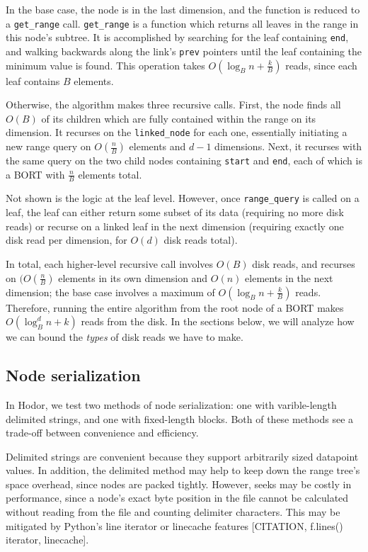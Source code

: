 \documentclass[11pt, oneside]{article}
\newcommand{\ms}{\texttt}
\begin{document}
In the base case, the node is in the last dimension, and the function is reduced
to a \ms{get\_range} call. \ms{get\_range} is a function which returns all
leaves in the range in this node's subtree. It is accomplished by searching for
the leaf containing \ms{end}, and walking backwards along the link's \ms{prev}
pointers until the leaf containing the minimum value is found. This operation
takes $O(\log_B n + \frac{k}{B})$ reads, since each leaf contains $B$ elements.

Otherwise, the algorithm makes three recursive calls. First, the node finds all
$O(B)$ of its children which are fully contained within the range on its
dimension. It recurses on the \ms{linked\_node} for each one, essentially
initiating a new range query on $O(\frac{n}{B})$ elements and $d - 1$
dimensions. Next, it recurses with the same query on the two child nodes
containing \ms{start} and \ms{end}, each of which is a BORT with $\frac{n}{B}$
elements total.

Not shown is the logic at the leaf level. However, once \ms{range\_query} is
called on a leaf, the leaf can either return some subset of its data (requiring
no more disk reads) or recurse on a linked leaf in the next dimension (requiring
exactly one disk read per dimension, for $O(d)$ disk reads total).

In total, each higher-level recursive call involves $O(B)$ disk reads, and
recurses on $(O(\frac{n}{B})$ elements in its own dimension and $O(n)$ elements
in the next dimension; the base case involves a maximum of $O(\log_B n +
\frac{k}{B})$ reads. Therefore, running the entire algorithm from the root node
of a BORT makes $O(\log_B^d n + k)$ reads from the disk. In the sections below,
we will analyze how we can bound the \textit{types} of disk reads we have to
make.


\subsection{Node serialization}

In Hodor, we test two methods of node serialization: one with varible-length 
delimited strings, and one with fixed-length blocks. Both of these methods see a
trade-off between convenience and efficiency. 

Delimited strings are convenient because they support arbitrarily sized
datapoint values. In addition, the delimited method may help to keep down the
range tree's space overhead, since nodes are packed tightly. However, seeks may
be costly in performance, since a node's exact byte position in the file cannot
be calculated without reading from the file and counting delimiter characters.
This may be mitigated by Python's line iterator or linecache features
[CITATION, f.lines() iterator, linecache]. 
\end{document}
